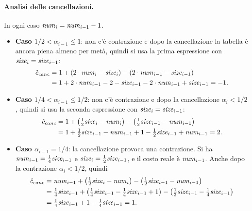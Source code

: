 \paragraph{Analisi delle cancellazioni.}
In ogni caso $\mathit{num}_i = \mathit{num}_{i-1} - 1$.
\begin{itemize}
    \item \textbf{Caso $1/2 < \alpha_{i-1} \le 1$}: non c'è contrazione e dopo la cancellazione la tabella è ancora piena almeno per metà, quindi si usa la prima espressione con $\mathit{size}_i = \mathit{size}_{i-1}$:
    \[
    \begin{aligned}
    \hat{c}_{canc} &= 1 + (2\cdot\mathit{num}_i - \mathit{size}_i) - (2\cdot\mathit{num}_{i-1} - \mathit{size}_{i-1}) \\
    &= 1 + 2\cdot\mathit{num}_{i-1} - 2 - \mathit{size}_{i-1} - 2\cdot\mathit{num}_{i-1} + \mathit{size}_{i-1} = -1.
    \end{aligned}
    \]
    \item \textbf{Caso $1/4 < \alpha_{i-1} \le 1/2$}: non c'è contrazione e dopo la cancellazione $\alpha_i < 1/2$, quindi si usa la seconda espressione con $\mathit{size}_i = \mathit{size}_{i-1}$:
    \[
    \begin{aligned}
    \hat{c}_{canc} &= 1 + \left(\tfrac{1}{2}\mathit{size}_i - \mathit{num}_i\right) - \left(\tfrac{1}{2}\mathit{size}_{i-1} - \mathit{num}_{i-1}\right) \\
    &= 1 + \tfrac{1}{2}\mathit{size}_{i-1} - \mathit{num}_{i-1} + 1 - \tfrac{1}{2}\mathit{size}_{i-1} + \mathit{num}_{i-1} = 2.
    \end{aligned}
    \]
    \item \textbf{Caso $\alpha_{i-1} = 1/4$}: la cancellazione provoca una contrazione. Si ha $\mathit{num}_{i-1} = \frac{1}{4}\mathit{size}_{i-1}$ e $\mathit{size}_i = \frac{1}{2}\mathit{size}_{i-1}$, e il costo reale è $\mathit{num}_{i-1}$. Anche dopo la contrazione $\alpha_i < 1/2$, quindi
    \[
    \begin{aligned}
    \hat{c}_{canc} &= \mathit{num}_{i-1} + \left(\tfrac{1}{2}\mathit{size}_i - \mathit{num}_i\right) - \left(\tfrac{1}{2}\mathit{size}_{i-1} - \mathit{num}_{i-1}\right) \\
    &= \tfrac{1}{4}\mathit{size}_{i-1} + \left(\tfrac{1}{4}\mathit{size}_{i-1} - \tfrac{1}{4}\mathit{size}_{i-1} + 1\right) - \left(\tfrac{1}{2}\mathit{size}_{i-1} - \tfrac{1}{4}\mathit{size}_{i-1}\right) \\
    &= \tfrac{1}{4}\mathit{size}_{i-1} + 1 - \tfrac{1}{4}\mathit{size}_{i-1} = 1.
    \end{aligned}
    \]
\end{itemize}

